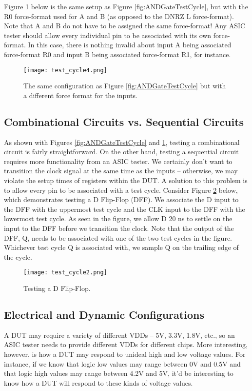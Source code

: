 Figure \ref{fig:ANDGateTestCycleFF} below is the same setup as Figure \ref{fig:ANDGateTestCycle}, but with the R0 force-format used for A and B (as opposed to the DNRZ L force-format). Note that A and B do not have to be assigned the same force-format! Any ASIC tester should allow every individual pin to be associated with its own force-format. In this case, there is nothing invalid about input A being associated force-format R0 and input B being associated force-format R1, for instance.

\begin{figure}
\texttt{[image: test\_cycle4.png]}
\caption{The same configuration as Figure \ref{fig:ANDGateTestCycle} but with a different force format for the inputs.}
\label{fig:ANDGateTestCycleFF}
\end{figure}

\subsection{Combinational Circuits vs. Sequential Circuits}
As shown with Figures \ref{fig:ANDGateTestCycle} and \ref{fig:ANDGateTestCycleFF}, testing a combinational circuit is fairly straightforward. On the other hand, testing a sequential circuit requires more functionality from an ASIC tester. We certainly don't want to transition the clock signal at the same time as the inputs -- otherwise, we may violate the setup times of registers within the DUT. A solution to this problem is to allow every pin to be associated with a test cycle. Consider Figure \ref{fig:DFFTestCycles} below, which demonstrates testing a D Flip-Flop (DFF). We associate the D input to the DFF with the uppermost test cycle and the CLK input to the DFF with the lowermost test cycle. As seen in the figure, we allow D 20 ns to settle on the input to the DFF before we transition the clock. Note that the output of the DFF, Q, needs to be associated with one of the two test cycles in the figure. Whichever test cycle Q is associated with, we sample Q on the trailing edge of the cycle.

\begin{figure}
\texttt{[image: test\_cycle2.png]}
\caption{Testing a D Flip-Flop.}
\label{fig:DFFTestCycles}
\end{figure}

\subsection{Electrical and Dynamic Configurations}
A DUT may require a variety of different VDDs -- 5V, 3.3V, 1.8V, etc., so an ASIC tester needs to provide different VDDs for different chips. More interesting, however, is how a DUT may respond to unideal high and low voltage values. For instance, if we know that logic low values may range between 0V and 0.5V and that logic high values may range between 4.2V and 5V, it'd be interesting to know how a DUT will respond to these kinds of voltage values.

